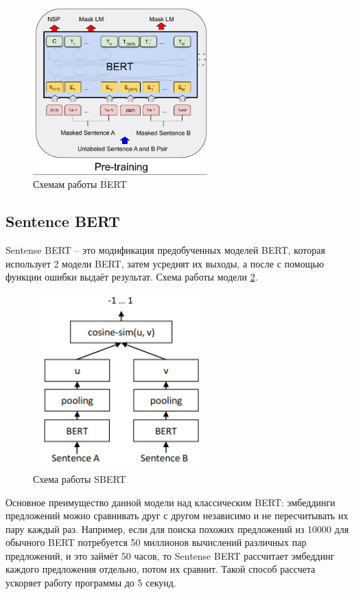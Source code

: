 \documentclass[PI, VKR]{HSEUniversity}
\begin{document}
\begin{enumerate}
\begin{figure}[hbp]
\centering
\includegraphics[width=0.6\textwidth]{img/bert_pretrainin.png}
\caption{\label{fig:bert_pretrainin}Схемам работы BERT}
\end{figure}
\end{enumerate}
\subsection{Sentence BERT}
\label{sec:orgddfdc17}
Sentense BERT \autocite{reimers_sentence-bert_2019} -- это модификация предобученных моделей BERT, которая использует 2 модели BERT, затем усреднят их выходы, а после с помощью функции ошибки выдаёт результат. Схема работы модели \ref{fig:sbert}.
\begin{figure}[h!]
\centering
\includegraphics[width=0.6\textwidth]{img/sbert.png}
\caption{\label{fig:sbert}Схема работы SBERT}
\end{figure}
Основное преимущество данной модели над классическим BERT: эмбеддинги предложений можно сравнивать друг с другом независимо и не пересчитывать их пару каждый раз. Например, если для поиска похожих предложений из 10000 для обычного BERT потребуется 50 миллионов вычислений различных пар предложений, и это займёт 50 часов, то Sentense BERT рассчитает эмбеддинг каждого предложения отдельно, потом их сравнит. Такой способ рассчета ускоряет работу программы до 5 секунд.
\end{document}
